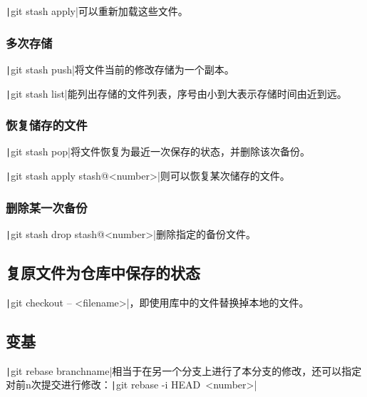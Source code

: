 \documentclass[fontset=ubuntu]{ctexart}
\begin{document}
\texttt|git stash apply|可以重新加载这些文件。

\subsubsection{多次存储}
\texttt|git stash push|将文件当前的修改存储为一个副本。

\texttt|git stash list|能列出存储的文件列表，序号由小到大表示存储时间由近到远。

\subsubsection{恢复储存的文件}
\texttt|git stash pop|将文件恢复为最近一次保存的状态，并删除该次备份。

\texttt|git stash apply stash@{<number>}|则可以恢复某次储存的文件。

\subsubsection{删除某一次备份}
\texttt|git stash drop stash@{<number>}|删除指定的备份文件。

\subsection{复原文件为仓库中保存的状态}
\texttt|git checkout -- <filename>|，即使用库中的文件替换掉本地的文件。

\subsection{变基}
\texttt|git rebase {branchname}|相当于在另一个分支上进行了本分支的修改，还可以指定对前n次提交进行修改：\texttt|git rebase -i HEAD~{<number>}|
\end{document}
